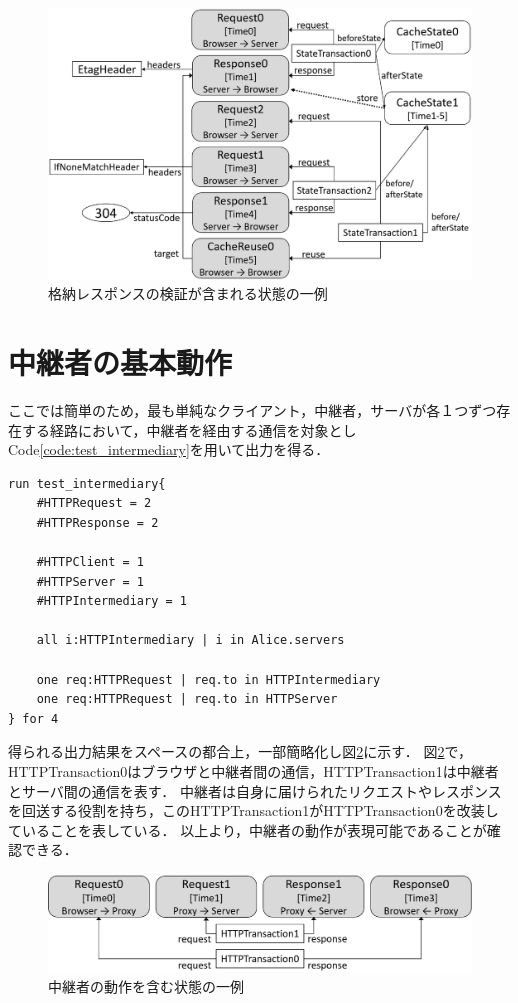 \documentclass[12pt,a4paper]{jbook}
\begin{document}
\begin{figure}[htb]
\centering
\includegraphics[width=450pt]{./fig/TestVerification.eps}
\caption{格納レスポンスの検証が含まれる状態の一例}
\label{fig:TestVerification}
\end{figure}

\section{中継者の基本動作}
ここでは簡単のため，最も単純なクライアント，中継者，サーバが各１つずつ存在する経路において，中継者を経由する通信を対象としCode\ref{code:test_intermediary}を用いて出力を得る．

\begin{lstlisting}[caption=中継者の動作, label=code:test_intermediary]
run test_intermediary{
	#HTTPRequest = 2
	#HTTPResponse = 2

	#HTTPClient = 1
	#HTTPServer = 1
	#HTTPIntermediary = 1

	all i:HTTPIntermediary | i in Alice.servers

	one req:HTTPRequest | req.to in HTTPIntermediary
	one req:HTTPRequest | req.to in HTTPServer
} for 4
\end{lstlisting}

得られる出力結果をスペースの都合上，一部簡略化し図\ref{fig:TestIntermediary}に示す．
図\ref{fig:TestIntermediary}で，HTTPTransaction0はブラウザと中継者間の通信，HTTPTransaction1は中継者とサーバ間の通信を表す．
中継者は自身に届けられたリクエストやレスポンスを回送する役割を持ち，このHTTPTransaction1がHTTPTransaction0を改装していることを表している．
以上より，中継者の動作が表現可能であることが確認できる．

\begin{figure}[htb]
\centering
\includegraphics[width=450pt]{./fig/TestIntermediary.eps}
\caption{中継者の動作を含む状態の一例}
\label{fig:TestIntermediary}
\end{figure}
\end{document}
